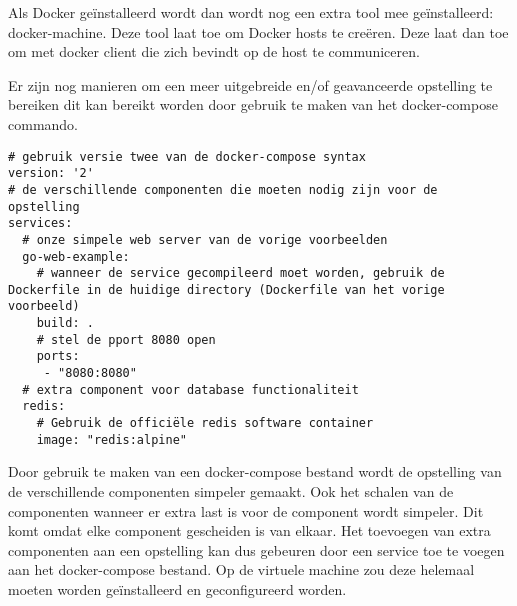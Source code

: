 Als Docker geïnstalleerd wordt dan wordt nog een extra tool mee geïnstalleerd: docker-machine. Deze tool laat toe om Docker hosts te creëren. Deze laat dan toe om met docker client die zich bevindt op de host te communiceren. 

Er zijn nog manieren om een meer uitgebreide en/of geavanceerde opstelling te bereiken dit kan bereikt worden door gebruik te maken van het docker-compose commando.

\begin{lstlisting}[language=docker-compose,caption={docker-compose.yaml},breaklines=true,label={code:docker-compose}]
# gebruik versie twee van de docker-compose syntax
version: '2'
# de verschillende componenten die moeten nodig zijn voor de opstelling
services:
  # onze simpele web server van de vorige voorbeelden
  go-web-example:
    # wanneer de service gecompileerd moet worden, gebruik de Dockerfile in de huidige directory (Dockerfile van het vorige voorbeeld)
    build: .
    # stel de pport 8080 open
    ports:
     - "8080:8080"
  # extra component voor database functionaliteit
  redis:
    # Gebruik de officiële redis software container
    image: "redis:alpine"
\end{lstlisting}

Door gebruik te maken van een docker-compose bestand wordt de opstelling van de verschillende componenten simpeler gemaakt. Ook het schalen van de componenten wanneer er extra last is voor de component wordt simpeler. Dit komt omdat elke component gescheiden is van elkaar. Het toevoegen van extra componenten aan een opstelling kan dus gebeuren door een service toe te voegen aan het docker-compose bestand. Op de virtuele machine zou deze helemaal moeten worden geïnstalleerd en geconfigureerd worden. 